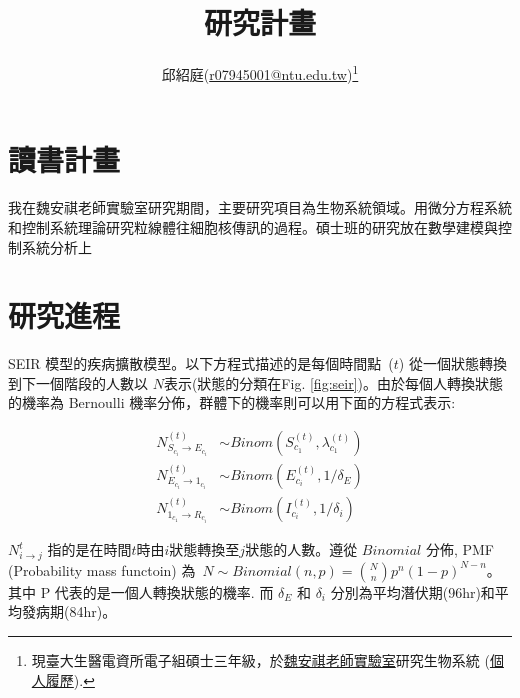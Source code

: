 \documentclass[12pt, a4paper]{article}
\title{\textbf{研究計畫}}
\author{邱紹庭(\href{mailto:r07945001@ntu.edu.tw}{r07945001@ntu.edu.tw})\thanks{現臺大生醫電資所電子組碩士三年級，於\href{https://ntubmse.com/}{魏安祺老師實驗室}研究生物系統 (\href{https://drive.google.com/file/d/1dyBDxwvc3T4O5-BkM7Hrb8Lq1OcsbrCi/view?usp=sharing}{個人履歷}).}}
\begin{document}
\maketitle

\section{讀書計畫}

我在魏安祺老師實驗室研究期間，主要研究項目為生物系統領域。用微分方程系統和控制系統理論研究粒線體往細胞核傳訊的過程。碩士班的研究放在數學建模與控制系統分析上\cite{chiu2020}

\section{研究進程}





\begin{tcolorbox}[title=隨機 SEIR 模型]
    SEIR 模型的疾病擴散模型。以下方程式描述的是每個時間點~($t$) 從一個狀態轉換到下一個階段的人數以 $N$表示(狀態的分類在Fig. \ref{fig:seir})。由於每個人轉換狀態的機率為 Bernoulli 機率分佈，群體下的機率則可以用下面的方程式表示:
    
    \begin{align} 
        N^{(t)}_{S_{c_i}\rightarrow E_{c_i}} & \sim  Binom(S^{(t)}_{c_1},  \lambda^{(t)}_{c_1}) \label{eq:N_S2E}\\
        N^{(t)}_{E_{c_i}\rightarrow 1_{c_i}} & \sim Binom(E^{(t)}_{c_i}, 1/\delta_{E}) \\
        N^{(t)}_{1_{c_1}\rightarrow R_{c_i}} & \sim Binom(I^{(t)}_{c_i}, 1/ \delta_{i})  
    \end{align}
    
    $N^{t}_{i\rightarrow j}$ 指的是在時間$t$時由$i$狀態轉換至$j$狀態的人數。遵從 $Binomial$ 分佈, PMF (Probability mass functoin) 為~$N \sim Binomial(n,p) = {N\choose n} p^{n}(1-p)^{N-n} $。其中 P 代表的是一個人轉換狀態的機率. 而 $\delta_E$ 和 $\delta_i$ 分別為平均潛伏期(96hr)和平均發病期(84hr)\cite{vinfo2020}。
    \end{tcolorbox}



\end{document}
